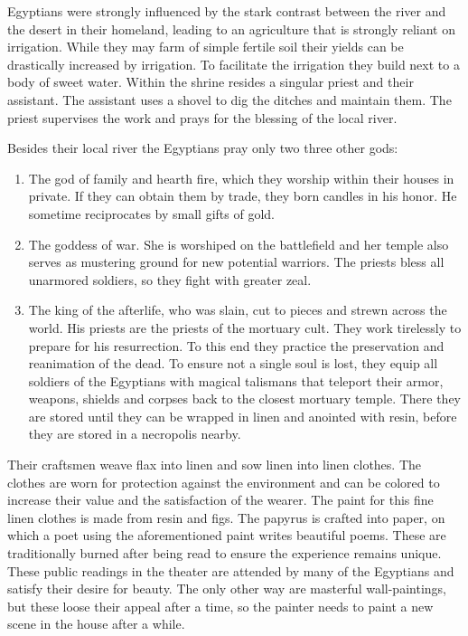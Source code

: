 \documentclass[a4paper]{book}
\begin{document}
	\Gls{Egyptians} were strongly influenced by the stark contrast between
	the river and the desert in their homeland,
	leading to an agriculture that is strongly reliant on irrigation.
	While they may farm of simple fertile soil their yields can be drastically 
	increased by irrigation.
	To facilitate the irrigation they build  next to a body of sweet water.
	Within the shrine resides a singular priest and their assistant.
	The assistant uses a shovel to dig the ditches and maintain them.
	The priest supervises the work and prays for the blessing of the local river.

	Besides their local river the \gls{Egyptians} pray only two three other gods:

	\begin{enumerate}
		\item The god of family and hearth fire, which they worship within their houses in private.
			If they can obtain them by trade, they born candles in his honor.
			He sometime reciprocates by small gifts of gold.
		\item The goddess of war. She is worshiped on the battlefield and her temple
			also serves as mustering ground for new potential warriors.
			The priests bless all unarmored soldiers, so they fight with greater zeal.
		\item The king of the afterlife, who was slain, cut to pieces and strewn across the world.
			His priests are the priests of the mortuary cult.
			They work tirelessly to prepare for his resurrection.
			To this end they practice the preservation and reanimation of the dead.
			To ensure not a single soul is lost,
			they equip all soldiers of the \gls{Egyptians} with magical talismans
			that teleport their armor, weapons, shields and corpses back to the closest mortuary temple.
			There they are stored until they can be wrapped in linen and anointed with resin,
			before they are stored in a necropolis nearby.
	\end{enumerate}

	Their craftsmen weave flax into linen and sow linen into linen clothes.
	The clothes are worn for protection against the environment
	and can be colored to increase their value and the satisfaction of the wearer. 
	The paint for this fine linen clothes is made from resin and figs.
	The papyrus is crafted into paper, on which a poet using the aforementioned paint
	writes beautiful poems.
	These are traditionally burned after being read to ensure the experience remains unique.
	These public readings in the theater are attended by many of the \gls{Egyptians}
	and satisfy their desire for beauty.
	The only other way are masterful wall-paintings,
	but these loose their appeal after a time,
	so the painter needs to paint a new scene in the house after a while.
\end{document}
